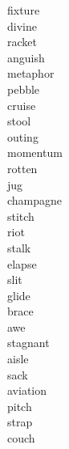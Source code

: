 \documentclass[a4paper, 11pt]{ctexart}
\begin{document}
\begin{multicols*}{3}
\begin{description}
\item[fixture]

\item[divine]

\item[racket]

\item[anguish]

\item[metaphor]

\item[pebble]

\item[cruise]

\item[stool]

\item[outing]

\item[momentum]

\item[rotten]

\item[jug]

\item[champagne]

\item[stitch]

\item[riot]

\item[stalk]

\item[elapse]

\item[slit]

\item[glide]

\item[brace]

\item[awe]

\item[stagnant]

\item[aisle]

\item[sack]

\item[aviation]

\item[pitch]

\item[strap]

\item[couch]


\end{description}
\end{multicols*}
\end{document}
